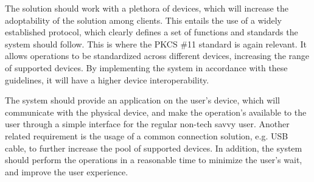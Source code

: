 The solution should work with a plethora of devices, which will increase the adoptability of the solution among clients. This entails the use of a widely established protocol, which clearly defines a set of functions and standards the system should follow.
This is where the \ac{PKCS} \#11 standard is again relevant. It allows operations to be standardized across different devices, increasing the range of supported devices. By implementing the system in accordance with these guidelines, it will have a higher device interoperability.

The system should provide an application on the user's device, which will communicate with the physical device, and make the operation's available to the user through a simple interface for the regular non-tech savvy user.
Another related requirement is the usage of a common connection solution, e.g. USB cable, to further increase the pool of supported devices.
In addition, the system should perform the operations in a reasonable time to minimize the user's wait, and improve the user experience.
%
%
%
